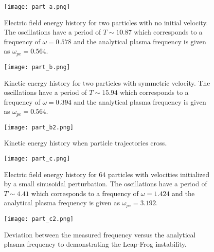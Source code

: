 \documentclass[12pt]{report}
\begin{document}
\begin{figure}
\centering
\texttt{[image: part\_a.png]}
\caption{Electric field energy history for two particles with no initial velocity. The oscillations have a period of $T\sim10.87$ which corresponds to a frequency of $\omega=0.578$ and the analytical plasma frequency is given as $\omega_{pe}=0.564$.}
\end{figure}

\begin{figure}
\centering
\texttt{[image: part\_b.png]}
\caption{Kinetic energy history for two particles with symmetric velocity. The oscillations have a period of $T\sim15.94$ which corresponds to a frequency of $\omega=0.394$ and the analytical plasma frequency is given as $\omega_{pe}=0.564$.}
\end{figure}

\begin{figure}
\centering
\texttt{[image: part\_b2.png]}
\caption{Kinetic energy history when particle trajectories cross.}
\end{figure}

\begin{figure}
\centering
\texttt{[image: part\_c.png]}
\caption{Electric field energy history for 64 particles with velocities initialized by a small sinusoidal perturbation. The oscillations have a period of $T\sim4.41$ which corresponds to a frequency of $\omega=1.424$ and the analytical plasma frequency is given as $\omega_{pe}=3.192$.}
\end{figure}

\begin{figure}
\centering
\texttt{[image: part\_c2.png]}
\caption{Deviation between the measured frequency versus the analytical plasma frequency to demonstrating the Leap-Frog instability.}
\end{figure}
\end{document}
